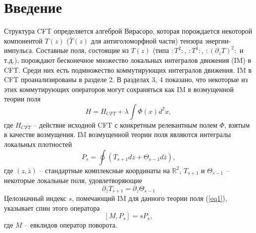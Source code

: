 \documentclass[12pt]{article}
\theoremstyle{definition}
\begin{document}
\section{Введение}
Структура CFT определяется алгеброй Вирасоро, которая порождается некоторой компонентой $T(z)$ ($\bar{T}(z)$ для антиголоморфной части) тензора энергии-импульса. Составные поля, состоящие из $T(z)$ (типа $:T^2:$, $:T^3:$, $:(\partial_zT)^2:$ и т.д.), порождают бесконечное множество локальных интегралов движения (IM) в CFT. Среди них есть подмножество коммутирующих интегралов движения. IM в CFT проанализированы в разделе 2. В разделах 3, 4 показано, что некоторые из этих коммутирующих операторов могут сохраняться как IM в возмущенной теории поля
\begin{equation}\label{eq1}
    H=H_{CFT}+\lambda\int\Phi(x)d^2x,
\end{equation}
где $H_{CFT}$ -- действие исходной CFT с конкретным релевантным полем $\Phi$, взятым в качестве возмущения. IM возмущенной теории поля являются интегралы локальных плотностей
\begin{equation}\label{eq2}
    P_s=\oint(T_{s+1}dz+\Theta_{s-1}d\bar{z}),
\end{equation}
где $(z,\bar{z})$ -- стандартные комплексные координаты на $\mathbb{R}^2$, $T_{s+1}$ и $\Theta_{s-1}$ -- некоторые локальные поля, удовлетворяющие
\begin{equation}
    \partial_{\bar{z}}T_{s+1}=\partial_z\Theta_{s-1}
\end{equation}
Целозначный индекс $s$, помечающий IM для данного теории поля (\ref{eq1}), указывает спин этого оператора
\begin{equation}\label{eq3}
    [M,P_s]=sP_s,
\end{equation}
где $M$ -- евклидов оператор поворота.
\end{document}
